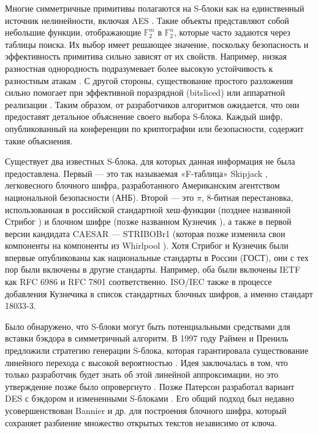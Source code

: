\introduction
Многие симметричные примитивы полагаются на S-блоки как на единственный источник нелинейности, включая AES \cite{AES01}. Такие объекты представляют собой небольшие функции, отображающие \(\mathbb{F}_2^m\) в \(\mathbb{F}_2^n\), которые часто задаются через таблицы поиска. Их выбор имеет решающее значение, поскольку безопасность и эффективность примитива сильно зависят от их свойств. Например, низкая разностная однородность \cite{Nyb94} подразумевает более высокую устойчивость к разностным атакам \cite{BS91a, BS91b}. С другой стороны, существование простого разложения сильно помогает при эффективной поразрядной (bitsliced) или аппаратной реализации \cite{LW14, CDL16}. Таким образом, от разработчиков алгоритмов ожидается, что они предоставят детальное объяснение своего выбора S-блока. Каждый шифр, опубликованный на конференции по криптографии или безопасности, содержит такие объяснения.

Существует два известных S-блока, для которых данная информация не была предоставлена. Первый — это так называемая «F-таблица» Skipjack \cite{US98}, легковесного блочного шифра, разработанного Американским агентством национальной безопасности (АНБ). Второй — это \(\pi\), 8-битная перестановка, использованная в российской стандартной хеш-функции (позднее названной Стрибог \cite{Fed12}) и блочном шифре (позже названном Кузнечик \cite{Fed15}), а также в первой версии кандидата CAESAR — STRIBOBr1 \cite{Saa14} (которая позже изменила свои компоненты на компоненты из Whirlpool \cite{SB15}). Хотя Стрибог и Кузнечик были впервые опубликованы как национальные стандарты в России (ГОСТ), они с тех пор были включены в другие стандарты. Например, оба были включены IETF как RFC 6986 \cite{DD13} и RFC 7801 \cite{Dol16} соответственно. ISO/IEC также в процессе добавления Кузнечика в список стандартных блочных шифров, а именно стандарт 18033-3.

Было обнаружено, что S-блоки могут быть потенциальными средствами для вставки бэкдора в симметричный алгоритм. В 1997 году Раймен и Прениль предложили стратегию генерации S-блока, которая гарантировала существование линейного перехода с высокой вероятностью \cite{RP97}. Идея заключалась в том, что только разработчик будет знать об этой линейной аппроксимации, но это утверждение позже было опровергнуто \cite{WBDY98}. Позже Патерсон разработал вариант DES с бэкдором и измененными S-блоками \cite{Pat99}. Его общий подход был недавно усовершенствован Bannier и др. \cite{BBF16} для построения блочного шифра, который сохраняет разбиение множество открытых текстов независимо от ключа.

